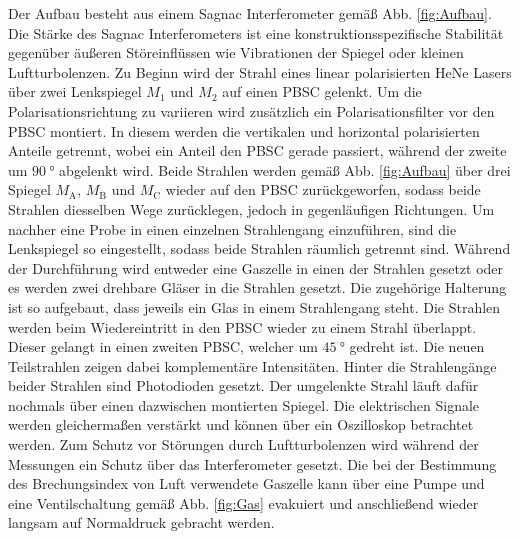Der Aufbau besteht aus einem Sagnac Interferometer gemäß Abb. \ref{fig:Aufbau}. Die Stärke des Sagnac Interferometers ist eine konstruktionsspezifische Stabilität gegenüber äußeren Störeinflüssen wie Vibrationen der Spiegel oder kleinen Luftturbolenzen. Zu Beginn wird der Strahl eines linear polarisierten HeNe Lasers über zwei Lenkspiegel $M_\text{1}$ und $M_\text{2}$ auf einen PBSC gelenkt. Um die Polarisationsrichtung zu variieren wird zusätzlich ein Polarisationsfilter vor den PBSC montiert. In diesem werden die vertikalen und horizontal polarisierten Anteile getrennt, wobei ein Anteil den PBSC gerade passiert, während der zweite um $\SI{90}{\degree}$ abgelenkt wird. Beide Strahlen werden gemäß Abb. \ref{fig:Aufbau} über drei Spiegel $M_\text{A}$, $M_\text{B}$ und $M_\text{C}$ wieder auf den PBSC zurückgeworfen, sodass beide Strahlen diesselben Wege zurücklegen, jedoch in gegenläufigen Richtungen. Um nachher eine Probe in einen einzelnen Strahlengang einzuführen, sind die Lenkspiegel so eingestellt, sodass beide Strahlen räumlich getrennt sind. Während der Durchführung wird entweder eine Gaszelle in einen der Strahlen gesetzt oder es werden zwei drehbare Gläser in die Strahlen gesetzt. Die zugehörige Halterung ist so aufgebaut, dass jeweils ein Glas in einem Strahlengang steht. Die Strahlen werden beim Wiedereintritt in den PBSC wieder zu einem Strahl überlappt. Dieser gelangt in einen zweiten PBSC, welcher um $\SI{45}{\degree}$ gedreht ist. Die neuen Teilstrahlen zeigen dabei komplementäre Intensitäten. Hinter die Strahlengänge beider Strahlen sind Photodioden gesetzt. Der umgelenkte Strahl läuft dafür nochmals über einen dazwischen montierten Spiegel. Die elektrischen Signale werden gleichermaßen verstärkt und können über ein Oszilloskop betrachtet werden. Zum Schutz vor Störungen durch Luftturbolenzen wird während der Messungen ein Schutz über das Interferometer gesetzt. Die bei der Bestimmung des Brechungsindex von Luft verwendete Gaszelle kann über eine Pumpe und eine Ventilschaltung gemäß Abb. \ref{fig:Gas} evakuiert und anschließend wieder langsam auf Normaldruck gebracht werden.
